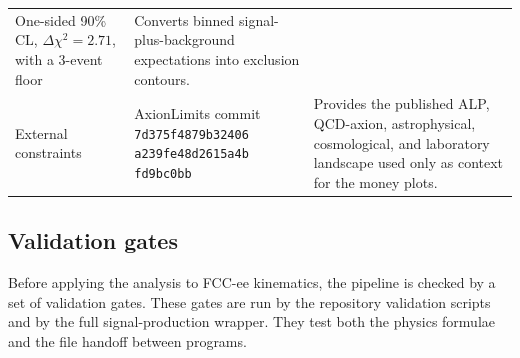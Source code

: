 \documentclass[12pt,a4paper]{article}
\newcommand{\dchi}{\Delta\chi^2}
\begin{document}
\begin{table}[t]
\begin{tabular}{p{}p{}p{}}
        One-sided 90\% CL, $\dchi=2.71$, with a 3-event floor &
        Converts binned signal-plus-background expectations into exclusion
        contours. \\
        External constraints &
        AxionLimits commit
        \texttt{7d375f4879b32406}\newline
        \texttt{a239fe48d2615a4b}\newline
        \texttt{fd9bc0bb} &
        Provides the published ALP, QCD-axion, astrophysical, cosmological,
        and laboratory landscape used only as context for the money plots. \\
        \bottomrule
    \end{tabular}
\end{table}

\subsection{Validation gates}

Before applying the analysis to FCC-ee kinematics, the pipeline is checked by a
set of validation gates. These gates are run by the repository validation
scripts and by the full signal-production wrapper. They test both the physics
formulae and the file handoff between programs.
\end{document}

